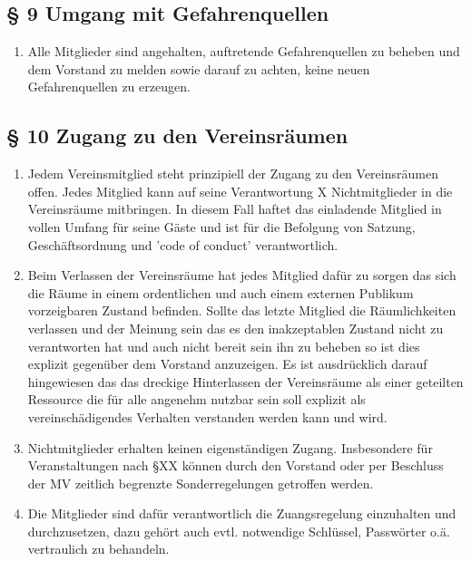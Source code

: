 \documentclass[10pt,a4paper]{article}
\begin{document}
\subsection*{§ 9 Umgang mit Gefahrenquellen}
\begin{enumerate}
\item Alle Mitglieder sind angehalten, auftretende Gefahrenquellen zu
	beheben und dem Vorstand zu melden sowie darauf zu achten, keine
	neuen Gefahrenquellen zu erzeugen.
\end{enumerate}

\subsection*{§ 10 Zugang zu den Vereinsräumen}
\begin{enumerate}
	\item Jedem Vereinsmitglied steht prinzipiell der Zugang zu den
		Vereinsräumen offen.  Jedes Mitglied kann auf seine
		Verantwortung X Nichtmitglieder in die Vereinsräume mitbringen.
		In diesem Fall haftet das einladende Mitglied in vollen Umfang
		für seine Gäste und ist für die Befolgung von Satzung,
		Geschäftsordnung und 'code of conduct' verantwortlich.
	\item Beim Verlassen der Vereinsräume hat jedes Mitglied dafür zu
		sorgen das sich die Räume in einem ordentlichen und auch einem
		externen Publikum vorzeigbaren Zustand befinden. Sollte das
		letzte Mitglied die Räumlichkeiten verlassen und der Meinung
		sein das es den inakzeptablen Zustand nicht zu verantworten hat
		und auch nicht bereit sein ihn zu beheben so ist dies explizit
		gegenüber dem Vorstand anzuzeigen. Es ist ausdrücklich darauf
		hingewiesen das das dreckige Hinterlassen der Vereinsräume als
		einer geteilten Ressource die für alle angenehm nutzbar sein
		soll explizit als vereinschädigendes Verhalten verstanden
		werden kann und wird.
	\item Nichtmitglieder erhalten keinen eigenständigen Zugang.
		Insbesondere für Veranstaltungen nach §XX %
		können durch den Vorstand oder per Beschluss der MV zeitlich
		begrenzte Sonderregelungen getroffen werden.
	\item Die Mitglieder sind dafür verantwortlich die Zuangsregelung
		einzuhalten und durchzusetzen, dazu gehört auch evtl.
		notwendige Schlüssel, Passwörter o.ä. vertraulich zu behandeln.
\end{enumerate}
\end{document}

